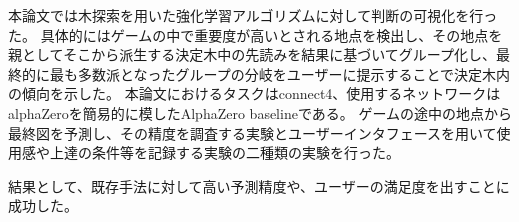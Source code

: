 \abstract
本論文では木探索を用いた強化学習アルゴリズムに対して判断の可視化を行った。
具体的にはゲームの中で重要度が高いとされる地点を検出し、その地点を親としてそこから派生する決定木中の先読みを結果に基づいてグループ化し、最終的に最も多数派となったグループの分岐をユーザーに提示することで決定木内の傾向を示した。
本論文におけるタスクはconnect4、使用するネットワークはalphaZeroを簡易的に模したAlphaZero baselineである。
ゲームの途中の地点から最終図を予測し、その精度を調査する実験とユーザーインタフェースを用いて使用感や上達の条件等を記録する実験の二種類の実験を行った。

結果として、既存手法に対して高い予測精度や、ユーザーの満足度を出すことに成功した。
